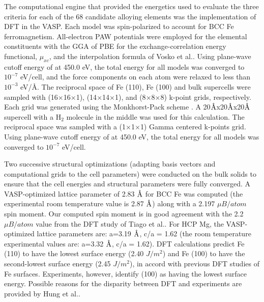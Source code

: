 The computational engine that provided the energetics used to evaluate the three criteria for each of the 68 candidate alloying elements was the implementation of \ac{DFT} in the \ac{VASP}. Each model was spin-polarized to account for \ac{BCC} Fe ferromagnetism. All-electron \ac{PAW} potentials were employed for the elemental constituents with the \ac{GGA} of \ac{PBE} for the exchange-correlation energy functional, $\mu_{xc}$, and the interpolation formula of Vosko et al.\cite{vosko1980accurate}. Using plane-wave cutoff energy of at 450.0 eV, the total energy for all models was converged to $10^{−7}$ eV/cell, and the force components on each atom were relaxed to less than $10^{−3}$ eV/Å. The reciprocal space of Fe (110), Fe (100) and bulk supercells were sampled with (16$\times$16$\times$1), (14$\times$14$\times$1), and (8$\times$8$\times$8) k-point grids, respectively. Each grid was generated using the Monkhorst-Pack scheme \cite{monkhorst1976special}. A 20$\mbox{\normalfont\AA}$x20$\mbox{\normalfont\AA}$x20$\mbox{\normalfont\AA}$ supercell with a $\text{H}_2$ molecule in the middle was used for this calculation. The reciprocal space was sampled with a (1$\times$1$\times$1) Gamma centered k-points grid. Using plane-wave cutoff energy of at 450.0 eV, the total energy for all models was converged to $10^{−7}$ eV/cell.


Two successive structural optimizations (adapting basis vectors and computational grids to the cell parameters) were conducted on the bulk solids to ensure that the cell energies and structural parameters were fully converged. A \ac{VASP}-optimized lattice parameter of 2.83 $\mbox{\normalfont\AA}$ for \ac{BCC} Fe was computed (the experimental room temperature value is 2.87 $\mbox{\normalfont\AA}$\cite{kohlhaas1967temperature}) along with a 2.197 $\mu B/atom$ spin moment. Our computed spin moment is in good agreement with the 2.2 $\mu B/atom$ value from the \ac{DFT} study of Tiago et al.\cite{tiago2006evolution}. For \ac{HCP} Mg, the VASP-optimized lattice parameters are: a=3.19 $\mbox{\normalfont\AA}$, c/a = 1.62 (the room temperature experimental values are: a=3.32 $\mbox{\normalfont\AA}$, c/a = 1.62\cite{wrobel2012thermodynamic}). DFT calculations predict Fe (110) to have the lowest surface energy (2.40 $J/m^2$) and Fe (100) to have the second-lowest surface energy (2.45 $J/m^2$), in accord with previous DFT studies of Fe surfaces\cite{hung2002first}.  Experiments, however, identify (100) as having the lowest surface energy\cite{tyson1977surface}. Possible reasons for the disparity between DFT and experiments are provided by Hung et al.\cite{hung2002first}.

